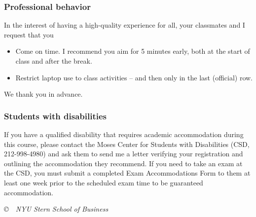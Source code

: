 \documentclass[letterpaper,12pt]{article}
\begin{document}
\subsubsection*{Professional behavior}

In the interest of having a high-quality experience for all, 
your classmates and I request that you 
%
\begin{itemize}
\item Come on time.  I recommend you aim for 5 minutes early, 
both at the start of class and after the break.  


\item Restrict laptop use to class activities -- 
and then only in the last (official) row.  
%
\end{itemize}
We thank you in advance.  


\subsubsection*{Students with disabilities}

If you have a qualified disability that requires academic accommodation during this course, 
please contact the Moses Center for Students with Disabilities (CSD, 212-998-4980) and ask them to 
send me a letter verifying your registration and outlining the accommodation they recommend.  
If you need to take an exam at the CSD, 
you must submit a completed Exam Accommodations Form to them 
at least one week prior to the scheduled exam time to be guaranteed accommodation.

\vfill \centerline{\it \copyright \ \number\year \ 
NYU Stern School of Business}
\end{document}
